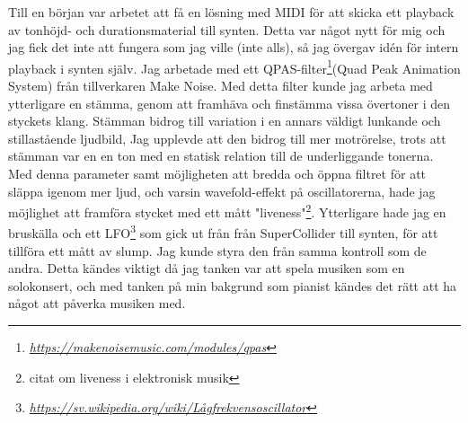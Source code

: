 \documentclass{article}
\begin{document}
Till en början var arbetet att få en lösning med MIDI för att skicka ett playback av tonhöjd- och
durationsmaterial till synten. Detta var något nytt för mig och jag fick det inte att fungera som jag
ville (inte alls), så jag övergav idén för intern playback i synten själv. 
Jag arbetade med ett QPAS-filter\footnote{\emph{\url{https://makenoisemusic.com/modules/qpas}}}(Quad Peak Animation System) från tillverkaren Make
Noise. Med detta filter kunde jag arbeta med ytterligare en stämma, genom att
framhäva och finstämma vissa övertoner i den styckets klang. Stämman bidrog till variation i en
annars väldigt lunkande och stillastående ljudbild, Jag upplevde att den bidrog till mer motrörelse,
trots att stämman var en en ton med en statisk relation till de underliggande tonerna. Med denna
parameter samt möjligheten att bredda och öppna filtret för att släppa igenom mer ljud, och varsin
wavefold-effekt på oscillatorerna, hade jag möjlighet att framföra stycket med ett mått
"liveness"\footnote{citat om liveness i elektronisk musik}. Ytterligare hade jag en bruskälla och ett
LFO\footnote{\emph{\url{https://sv.wikipedia.org/wiki/Lågfrekvensoscillator}}} som gick ut från från SuperCollider till synten, för att tillföra ett mått av slump.
Jag kunde styra den från samma kontroll som de andra. Detta kändes viktigt då jag tanken var att
spela musiken som en solokonsert, och med tanken på min bakgrund som pianist kändes det rätt att ha
något att påverka musiken med. 
\end{document}
